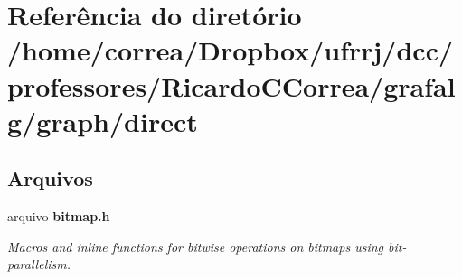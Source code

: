 \section{Referência do diretório /home/correa/\+Dropbox/ufrrj/dcc/professores/\+Ricardo\+C\+Correa/grafalg/graph/direct}
\label{dir_2e6b217dd714f0db6bdc64f392a5ae12}
\subsection*{Arquivos}
\begin{DoxyCompactItemize}
\item 
arquivo {\bf bitmap.\+h}
\begin{DoxyCompactList}\small\item\em Macros and inline functions for bitwise operations on bitmaps using bit-\/parallelism. \end{DoxyCompactList}\end{DoxyCompactItemize}

